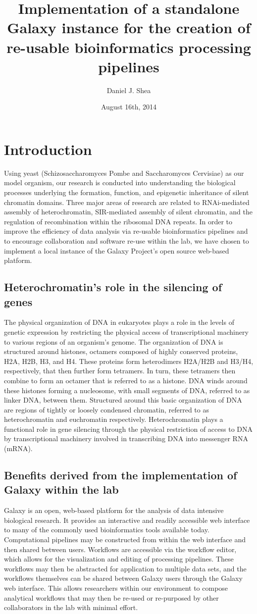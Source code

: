 \documentclass[a4paper,10pt]{article}
\title{Implementation of a standalone Galaxy instance for the creation of re-usable bioinformatics processing pipelines}
\author{Daniel J. Shea}
\date{August 16th, 2014}
\begin{document}
\maketitle
\pagebreak
\section{Introduction}
Using yeast (Schizosaccharomyces Pombe and Saccharomyces Cervisiae) as our model organism, our research is conducted into understanding the biological processes underlying the formation, function, and epigenetic inheritance of silent chromatin domains.  Three major areas of research are related to RNAi-mediated assembly of heterochromatin, SIR-mediated assembly of silent chromatin, and the regulation of recombination within the ribosomal DNA repeats.  In order to improve the efficiency of data analysis via re-usable bioinformatics pipelines and to encourage collaboration and software re-use within the lab, we have chosen to implement a local instance of the Galaxy Project's open source web-based platform.
\subsection{Heterochromatin's role in the silencing of genes}
The physical organization of DNA in eukaryotes plays a role in the levels of genetic expression by restricting the physical access of transcriptional machinery to various regions of an organism's genome.  The organization of DNA is structured around histones, octamers composed of highly conserved proteins, H2A, H2B, H3, and H4.  These proteins form heterodimers H2A/H2B and H3/H4, respectively, that then further form tetramers.  In turn, these tetramers then combine to form an octamer that is referred to as a histone.  DNA winds around these histones forming a nucleosome, with small segments of DNA, referred to as linker DNA, between them.  Structured around this basic organization of DNA are regions of tightly or loosely condensed chromatin, referred to as heterochromatin and euchromatin respectively.  Heterochromatin plays a functional role in gene silencing through the physical restriction of access to DNA by transcriptional machinery involved in transcribing DNA into messenger RNA (mRNA).
\subsection{Benefits derived from the implementation of Galaxy within the lab}
Galaxy is an open, web-based platform for the analysis of data intensive biological research.  It provides an interactive and readily accessible web interface to many of the commonly used bioinformatics tools available today.  Computational pipelines may be constructed from within the web interface and then shared between users.  Workflows are accessible via the workflow editor, which allows for the visualization and editing of processing pipelines.  These workflows may then be abstracted for application to multiple data sets, and the workflows themselves can be shared between Galaxy users through the Galaxy web interface.  This allows researchers within our environment to compose analytical workflows that may then be re-used or re-purposed by other collaborators in the lab with minimal effort.
\end{document}
